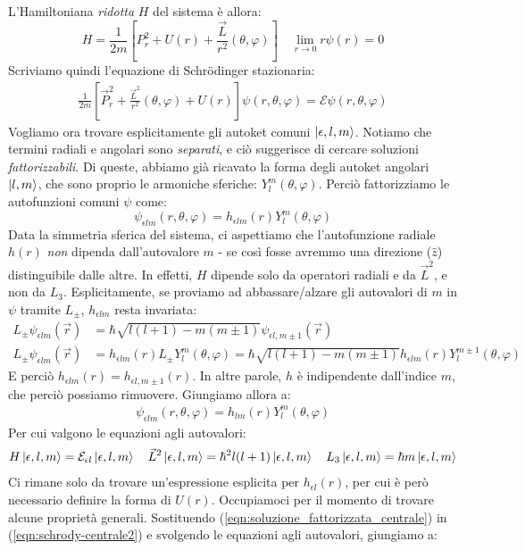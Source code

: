 \documentclass[../../FisicaTeorica.tex]{subfiles}
\begin{document}
L'Hamiltoniana \textit{ridotta} $H$ del sistema è allora:
\[
H = \frac{1}{2m}\left[P_r^2 + U(r) + \frac{\vec{L}}{r^2} (\theta,\varphi)\right]\quad \lim_{r\to 0} r\psi(r) = 0
\]
Scriviamo quindi l'equazione di Schr\"odinger stazionaria:
\begin{align}
\frac{1}{2m}\left[\vec{P}_r^2 + \frac{\vec{L}^2}{r^2}(\theta,\varphi) + U(r)\right] \psi(r,\theta,\varphi) = \mathcal{E}\psi(r,\theta,\varphi)
\label{eqn:schrody-centrale2}
\end{align}
Vogliamo ora trovare esplicitamente gli autoket comuni $\Ket{\epsilon, l, m}$.
Notiamo che termini radiali e angolari sono \textit{separati}, e ciò suggerisce di cercare soluzioni \textit{fattorizzabili}. Di queste, abbiamo già ricavato la forma degli autoket angolari $\Ket{l,m}$, che sono proprio le armoniche sferiche: $Y_l^m(\theta,\varphi)$. Perciò fattorizziamo le autofunzioni comuni $\psi$ come:
\[
\psi_{\epsilon l m}(r,\theta,\varphi) = h_{\epsilon l m}(r) Y^m_l(\theta,\varphi)
\]
Data la simmetria sferica del sistema, ci aspettiamo che l'autofunzione radiale $h(r)$ \textit{non} dipenda dall'autovalore $m$ - se così fosse avremmo una direzione ($\hat{z}$) distinguibile dalle altre. In effetti, $H$ dipende solo da operatori radiali e da $\vec{L}^2$, e non da $L_3$. Esplicitamente, se proviamo ad abbassare/alzare gli autovalori di $m$ in $\psi$ tramite $L_\pm$, $h_{\epsilon lm}$ resta invariata:
\begin{align*}
L_\pm \psi_{\epsilon l m}(\vec{r})&=\hbar \sqrt{l(l+1)-m(m\pm 1)}\psi_{\epsilon l, m\pm 1}(\vec{r})\\
L_\pm \psi_{\epsilon l m}(\vec{r}) &= h_{\epsilon l m}(r)L_\pm Y_l^m(\theta,\varphi)=\hbar \sqrt{l(l+1)-m(m\pm 1)}h_{\epsilon l m}(r) Y_l^{m\pm1}(\theta,\varphi)
\end{align*}
E perciò $h_{\epsilon l m}(r) = h_{\epsilon l, m\pm 1}(r)$. In altre parole, $h$ è indipendente dall'indice $m$, che perciò possiamo rimuovere. Giungiamo allora a:
\begin{align}
\psi_{\epsilon l m}(r,\theta,\varphi)=h_{lm}(r) Y_l^m(\theta,\varphi)
\label{eqn:soluzione_fattorizzata_centrale}
\end{align}
Per cui valgono le equazioni agli autovalori:
\begin{align*}
H \Ket{\epsilon, l ,m} = \mathcal{E}_{\epsilon l}\Ket{\epsilon, l,m} \quad \vec{L}^2 \Ket{\epsilon, l,m} = \hbar^2 l(l+1) \Ket{\epsilon, l,m} \quad L_3 \Ket{\epsilon,l,m} = \hbar m \Ket{\epsilon,l,m}
\end{align*}
Ci rimane solo da trovare un'espressione esplicita per $h_{\epsilon l}(r)$, per cui è però necessario definire la forma di $U(r)$. Occupiamoci per il momento di trovare alcune proprietà generali. Sostituendo (\ref{eqn:soluzione_fattorizzata_centrale}) in (\ref{eqn:schrody-centrale2}) e svolgendo le equazioni agli autovalori, giungiamo a:
\end{document}
